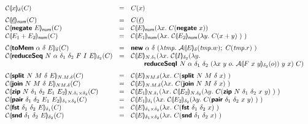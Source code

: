 \begin{figure}[H]
  \begin{displaymath}
    \begin{array}{lcl}
      \semE{x}_\delta(C)
      &=& C(x)
      \medskip\\
      \semE{\underline{\ell}}_{\num}(C)
      &=& C(\underline{\ell})
      \\
      \semE{\prim{negate}~E}_{\num}(C)
      &=& \semE{E}_{\num}(\lambda x.~C(\prim{negate}~x))
      \\
      \semE{E_1 + E_2}_{\num}(C)
      &=& \semE{E_1}_{\num}(\lambda x.~\semE{E_2}_{\num}(\lambda y.~C(x+y)~)~)
      \medskip\\

      \semE{\prim{toMem}~\alpha~\delta~E}_{\delta}(C)
        &=& \prim{new}~\alpha~\delta~(\lambda \mathit{tmp}.~\semA{E}_{\delta}(\mathit{tmp}.w);~C(\mathit{tmp}.r)~)
      \\
      \semE{\prim{reduceSeq}~N~\alpha~\delta_1~\delta_2~F~I~E}_{\delta_2}(C)
      &=& \begin{array}[t]{@{}l}
            \semE{E}_{N.\delta_1}(\lambda x.~
            \semE{I}_{\delta_2}(\lambda y.\\
      \quad\quad \prim{reduceSeqI}~N~\alpha~\delta_1~\delta_2~(\lambda x~y~o.~\semA{F~x~y}_{\delta_2}(o))~y~x)~C)
          \end{array}
      \medskip\\

      \semE{\prim{split}~N~M~\delta~E}_{N.M.\delta}(C)
      &=& \semE{E}_{NM.\delta}(\lambda x.~C(\prim{split}~N~M~\delta~x)~)
      \\
      \semE{\prim{join}~N~M~\delta~E}_{NM.\delta}(C)
      &=& \semE{E}_{N.M.\delta}(\lambda x.~C(\prim{join}~N~M~\delta~x)~)
      \\
      \semE{\prim{zip}~N~\delta_1~\delta_2~E_1~E_2}_{N.\delta_1 \times \delta_2}(C)
      &=& \semE{E_1}_{N.\delta_1}(\lambda x.~\semE{E_2}_{N.\delta_2}(\lambda y.~C(\prim{zip}~N~\delta_1~\delta_2~x~y)~)~)
      \\
      \semE{\prim{pair}~\delta_1~\delta_2~E_1~E_2}_{\delta_1\times\delta_2}(C)
      &=& \semE{E_1}_{\delta_1}(\lambda x.~\semE{E_2}_{\delta_2}(\lambda y.~C(\prim{pair}~\delta_1~\delta_2~x~y)~)~)
      \\
      \semE{\prim{fst}~\delta_1~\delta_2~E}_{\delta_1}(C)
      &=& \semE{E}_{\delta_1\times\delta_2}(\lambda x.~C(\prim{fst}~\delta_1~\delta_2~x)~)
      \\
      \semE{\prim{snd}~\delta_1~\delta_2~E}_{\delta_2}(C)
      &=& \semE{E}_{\delta_1\times\delta_2}(\lambda x.~C(\prim{snd}~\delta_1~\delta_2~x)~)
      \\
    \end{array}
  \end{displaymath}
  \label{fig:con-trans}
\end{figure}

